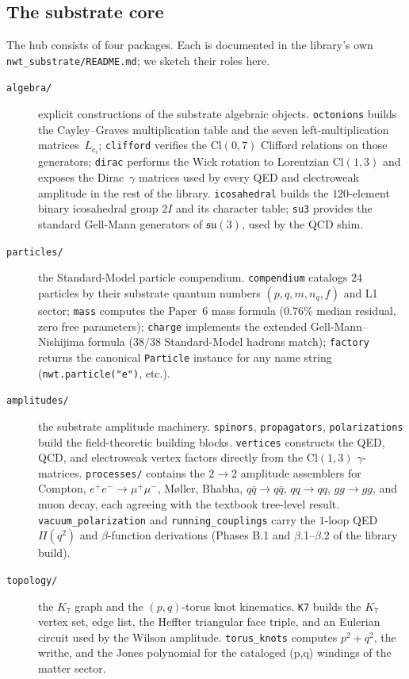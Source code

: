 \documentclass[11pt]{article}
\newcommand{\su}{\mathfrak{su}}
\begin{document}
\subsection{The substrate core}
\label{sec:substrate-core}

The hub consists of four packages.  Each is documented in
the library's own \texttt{nwt\_substrate/README.md}; we sketch
their roles here.

\begin{description}
\item[\texttt{algebra/}] explicit constructions of the substrate
  algebraic objects.  \texttt{octonions} builds the Cayley--Graves
  multiplication table and the seven left-multiplication
  matrices~$L_{e_i}$; \texttt{clifford} verifies the
  $\mathrm{Cl}(0,7)$ Clifford relations on those generators;
  \texttt{dirac} performs the Wick rotation to Lorentzian
  $\mathrm{Cl}(1,3)$ and exposes the Dirac~$\gamma$ matrices used
  by every QED and electroweak amplitude in the rest of the
  library.  \texttt{icosahedral} builds the $120$-element binary
  icosahedral group $2I$ and its character table;
  \texttt{su3} provides the standard
  Gell-Mann generators of $\su(3)$, used by the QCD shim.

\item[\texttt{particles/}] the Standard-Model particle compendium.
  \texttt{compendium} catalogs $24$ particles by their substrate
  quantum numbers $(p, q, m, n_q, f)$ and L1 sector;
  \texttt{mass} computes the Paper~6 mass formula
  ($0.76\%$ median residual, zero free parameters);
  \texttt{charge} implements the extended Gell-Mann--Nishijima
  formula ($38/38$ Standard-Model hadrons match);
  \texttt{factory} returns the canonical \texttt{Particle} instance
  for any name string (\texttt{nwt.particle("e")}, etc.).

\item[\texttt{amplitudes/}] the substrate amplitude machinery.
  \texttt{spinors}, \texttt{propagators}, \texttt{polarizations}
  build the field-theoretic building blocks.  \texttt{vertices}
  constructs the QED, QCD, and electroweak vertex factors directly
  from the $\mathrm{Cl}(1,3)$ $\gamma$-matrices.
  \texttt{processes/} contains the $2 \to 2$ amplitude assemblers
  for Compton, $e^+e^- \to \mu^+\mu^-$, M\o ller, Bhabha,
  $q\bar q \to q\bar q$, $qq \to qq$, $gg \to gg$, and muon decay,
  each agreeing with the textbook tree-level result.
  \texttt{vacuum\_polarization} and \texttt{running\_couplings}
  carry the $1$-loop QED $\Pi(q^2)$ and $\beta$-function
  derivations (Phases B.1 and $\beta$.1--$\beta$.2 of the library
  build).

\item[\texttt{topology/}] the $K_7$ graph and the $(p,q)$-torus
  knot kinematics.  \texttt{K7} builds the $K_7$ vertex set, edge
  list, the Heffter triangular face triple, and an Eulerian circuit
  used by the Wilson amplitude.  \texttt{torus\_knots} computes
  $p^2 + q^2$, the writhe, and the Jones polynomial for the
  cataloged (p,q) windings of the matter sector.
\end{description}
\end{document}
